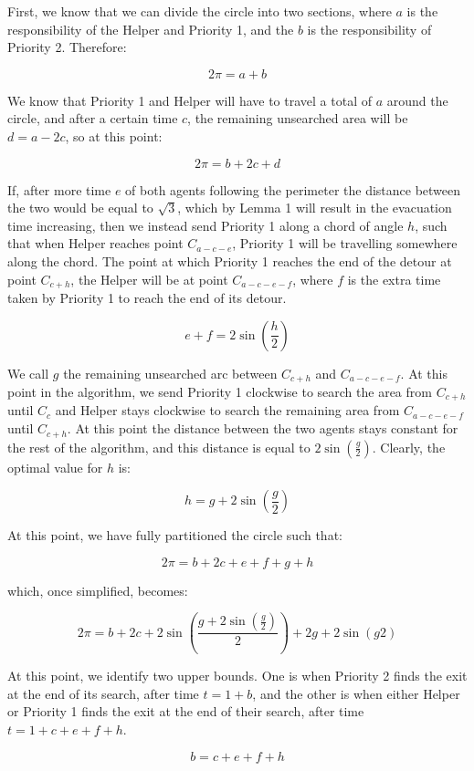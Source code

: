 \documentclass[11pt]{article}
\begin{document}
\begin{flushleft}
    First, we know that we can divide the circle into two sections, where $a$ is the
    responsibility of the Helper and Priority 1, and the $b$ is the responsibility of Priority 2.
    Therefore:

    \[ 2\pi = a + b \]

    We know that Priority 1 and Helper will have to travel a total of $a$ around the circle,
    and after a certain time $c$, the remaining unsearched area will be $d = a - 2c$, so at this point:

    \[ 2\pi = b + 2c + d \]

    If, after more time $e$ of both agents following the perimeter the distance between the two
    would be equal to $\sqrt{3}$, which by Lemma 1 will result in the evacuation time increasing, then
    we instead send Priority 1 along a chord of angle $h$, such that when Helper reaches point $C_{a - c - e}$, Priority 1 will be travelling somewhere along the chord. The point at which Priority 1 reaches the
    end of the detour at point $C_{c + h}$, the Helper will be at point $C_{a - c - e - f}$, where $f$ is the extra time taken by Priority 1 to reach the end of its detour.

    \[ e + f = 2\sin(\frac{h}{2}) \]

    We call $g$ the remaining unsearched arc between $C_{c + h}$ and $C_{a - c - e - f}$.
    At this point in the algorithm, we send Priority 1 clockwise to search the area from $C_{c + h}$ until
    $C_{c}$ and Helper stays clockwise to search the remaining area from $C_{a - c - e - f}$ until $C_{c + h}$. At this point the distance between the two agents stays constant for the rest of the algorithm, and this distance is equal to $2\sin(\frac{g}{2})$. Clearly, the optimal value for $h$ is:

    \[ h = g + 2\sin(\frac{g}{2})\]

    At this point, we have fully partitioned the circle such that:

    \[ 2\pi = b + 2c + e + f + g + h\]

    which, once simplified, becomes:

    \[ 2\pi = b + 2c + 2\sin(\frac{g + 2\sin(\frac{g}{2})}{2}) + 2g + 2\sin({g}{2}) \]

    At this point, we identify two upper bounds. One is when Priority 2 finds the exit at the end of its
    search, after time $t = 1 + b$, and the other is when either Helper or Priority 1
    finds the exit at the end of their search, after time $t = 1 + c + e + f + h$.

    \[b = c + e + f + h\]

\end{flushleft}
\end{document}
